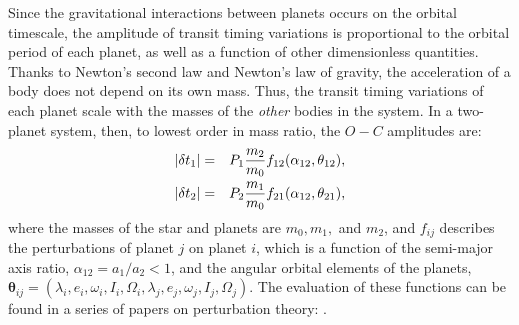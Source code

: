\documentclass[graybox,natbib,nosecnum]{svmult}
\begin{document}
Since the gravitational interactions between planets occurs on the orbital timescale, the
amplitude of transit timing variations is proportional to the orbital period of each planet,
as well as a function of other dimensionless quantities.  Thanks to Newton's second law
and Newton's law of gravity, the acceleration of a body does not depend on its own mass.
Thus, the transit timing variations of each planet scale with the masses of the {\it other} bodies
in the system.
In a two-planet system, then, to lowest order in mass ratio, the $O-C$ amplitudes are: 
\begin{eqnarray}
\vert \delta t_1\vert &=& P_1 \frac{m_2}{m_0} f_{12}(\alpha_{12},\mathbf{\theta}_{12}),\cr
\vert \delta t_2\vert &=& P_2 \frac{m_1}{m_0} f_{21}(\alpha_{12},\mathbf{\theta}_{21}),
\end{eqnarray}
where the masses of the star and planets are $m_0, m_1,$ and $m_2$, and $f_{ij}$ describes the perturbations of planet $j$ on planet $i$,
which is a function of the semi-major axis ratio, $\alpha_{12}= a_1/a_2 < 1$, and the angular orbital 
elements of the planets, $\mathbf{\theta}_{ij} = (\lambda_i,e_i,\omega_i,I_i,\Omega_i,\lambda_j,e_j,\omega_j,I_j,\Omega_j)$.  The evaluation of these functions can be found in a series of papers on perturbation theory: \cite{2008ApJ...688..636N, 2009ApJ...701.1116N,2010ApJ...709L..44N,2016ApJ...818..177A,2016ApJ...821...96D}.

\end{document}
